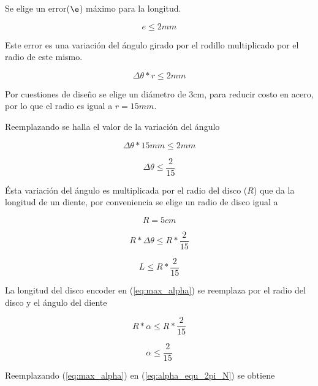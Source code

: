 \documentclass[main_conf.tex]{subfiles}
\begin{document}
Se elige un error($\e$) máximo para la longitud.

\begin{equation}
e \leq 2 mm
\end{equation}

Este error es una variación del ángulo girado por el rodillo 
multiplicado por el radio de este mismo.

\begin{equation}
\label{eq:delta_theta_r_leq_2mm}
\Delta  \theta *r \leq 2mm
\end{equation}

Por cuestiones de diseño se elige un diámetro de 3cm, para reducir
costo en acero, por lo que el radio es igual a $r=15mm$.

Reemplazando se halla el valor de la variación del ángulo

\begin{equation}
\Delta \theta * 15mm \leq 2mm
\end{equation}

\begin{equation}
\Delta  \theta\leq\frac{2}{15}
\end{equation}

Ésta variación del ángulo es multiplicada por el radio del disco
($R$) que da la longitud de un diente, por conveniencia se
elige un radio de disco igual a

\begin{equation}
R=5cm
\end{equation}

\begin{equation}
R*\Delta\theta\leq R*\frac{2}{15}
\end{equation}

\begin{equation}
\label{eq:max_L}
L\leq R*\frac{2}{15}
\end{equation}

La longitud del disco encoder en (\ref{eq:max_alpha}) se reemplaza 
por el radio del disco y el ángulo del diente

\begin{equation}
R*\alpha\leq R*\frac{2}{15}
\end{equation}

\begin{equation}
\label{eq:max_alpha}
\alpha\leq \frac{2}{15}
\end{equation}

Reemplazando (\ref{eq:max_alpha}) en (\ref{eq:alpha_equ_2pi_N}) se
obtiene
\end{document}

